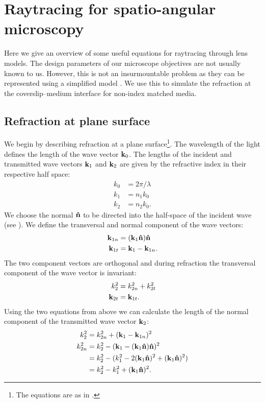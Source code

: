 \chapter{Raytracing for spatio-angular microscopy}
\label{sec:raytrace}
\renewcommand{\i}{\nvect i}

Here we give an overview of some useful equations for raytracing
through lens models. The design parameters of our microscope
objectives are not usually known to us. However, this is not an
insurmountable problem as they can be represented using a simplified
model \citep{Hwang2008}. We use this to simulate the refraction at the
coverslip--medium interface for non-index matched media.

\section{Refraction at plane surface}
We begin by describing refraction at a plane surface\footnote{The
  equations are as in \citep{McClain1993}.}. The wavelength of the
light defines the length of the wave vector $\mathbf{k}_0$. The lengths of the
incident and transmitted wave vectors $\mathbf{k}_1$ and $\mathbf{k}_2$ are given by
the refractive index in their respective half space:
\begin{align}
  k_0&=2\pi/\lambda\\
  k_1&=n_1 k_0\\
  k_2&=n_2 k_0.
\end{align}
We choose the normal $\mathbf{\hat{n}}$ to be directed into the half-space of the
incident wave (see ). We define the
transversal and normal component of the wave vectors:
\begin{align}
  \mathbf{k}_{1n}&=(\mathbf{k}_1\mathbf{\hat{n}})\mathbf{\hat{n}}\\ 
  \mathbf{k}_{1t}&=\mathbf{k}_1 - \mathbf{k}_{1n}.
\end{align}
The two component vectors are orthogonal and during refraction the
transversal component of the wave vector is invariant:
\begin{align}
  k_2^2&=k_{2n}^2 + k_{2t}^2\\
  \mathbf{k}_{2t}&=\mathbf{k}_{1t}.
\end{align}
Using the two equations from above we can calculate the length of the
normal component of the transmitted wave vector $\mathbf{k}_2$:
\begin{align}
  k_2^2&=k_{2n}^2 + (\mathbf{k}_1 - \mathbf{k}_{1n})^2\\
  k_{2n}^2&=k_2^2-(\mathbf{k}_1-(\mathbf{k}_1\mathbf{\hat{n}})\mathbf{\hat{n}})^2\\
  &= k_2^2-(k_1^2-2(\mathbf{k}_1\mathbf{\hat{n}})^2+(\mathbf{k}_1\mathbf{\hat{n}})^2)\\
  &= k_2^2-k_1^2+(\mathbf{k}_1\mathbf{\hat{n}})^2.
\end{align}
